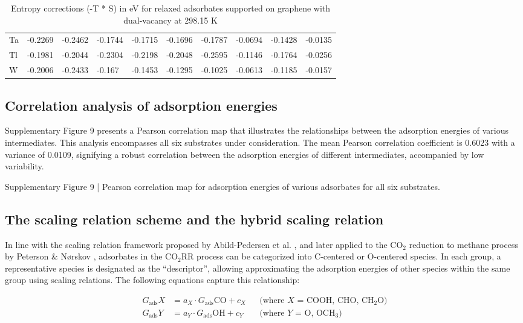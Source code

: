 \begin{table}[h]
{\begin{tabular}{*{10}{l}}
      Ta & -0.2269 & -0.2462 & -0.1744 & -0.1715 & -0.1696 & -0.1787 & -0.0694 & -0.1428 & -0.0135 \\
      Tl & -0.1981 & -0.2044 & -0.2304 & -0.2198 & -0.2048 & -0.2595 & -0.1146 & -0.1764 & -0.0256 \\
      W  & -0.2006 & -0.2433 & -0.167  & -0.1453 & -0.1295 & -0.1025 & -0.0613 & -0.1185 & -0.0157 \\
      \hline
  \end{tabular}
  }
  \caption{Entropy corrections (-T * S) in eV for relaxed adsorbates supported on graphene with dual-vacancy at 298.15 K}
  \label{si_table12}
\end{table}


\subsection{Correlation analysis of adsorption energies}
Supplementary Figure 9 presents a Pearson correlation map that illustrates the relationships between the adsorption energies of various intermediates. This analysis encompasses all six substrates under consideration. The mean Pearson correlation coefficient is 0.6023 with a variance of 0.0109, signifying a robust correlation between the adsorption energies of different intermediates, accompanied by low variability.


Supplementary Figure 9 | Pearson correlation map for adsorption energies of various adsorbates for all six substrates.


\subsection{The scaling relation scheme and the hybrid scaling relation}
In line with the scaling relation framework proposed by Abild-Pedersen et al. \cite{abild2007scaling},
and later applied to the CO$_2$ reduction to methane process by Peterson \& Nørskov \cite{peterson2012activity},
adsorbates in the CO$_2$RR process can be categorized into C-centered or O-centered species.
In each group, a representative species is designated as the “descriptor”, allowing approximating the adsorption energies of other species within the same group using scaling relations.
The following equations capture this relationship:

\begin{align}
  G_{\text{ads}}X &= a_X \cdot G_{\text{ads}}{\text{CO}} + c_X  && \text{(where  $X$ = COOH, CHO, CH$_2$O)} \\
  G_{\text{ads}}Y &= a_Y \cdot G_{\text{ads}}{\text{OH}} + c_Y  && \text{(where  $Y$ = O, OCH$_3$)}
\end{align}

